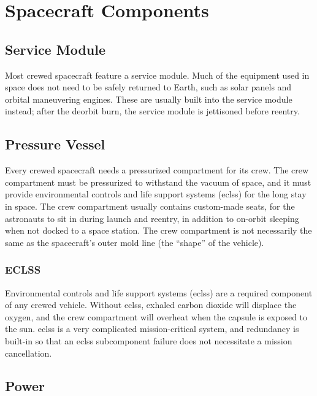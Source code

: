 
\chapter{Spacecraft Components}

\section{Service Module}

Most crewed spacecraft feature a service module. Much of the equipment
used in space does not need to be safely returned to Earth, such as
solar panels and orbital maneuvering engines. These are usually built
into the service module instead; after the deorbit burn, the service
module is jettisoned before reentry.


\section{Pressure Vessel}

Every crewed spacecraft needs a pressurized compartment for its
crew. The crew compartment must be pressurized to withstand the vacuum
of space, and it must provide environmental controls and life support
systems (\acrshort{eclss}) for the long stay in space. The crew compartment
usually contains custom-made seats, for the astronauts to sit in
during launch and reentry, in addition to on-orbit sleeping when not
docked to a space station. The crew compartment is not necessarily the
same as the spacecraft's outer mold line (the ``shape'' of the vehicle).


\subsection{ECLSS}

Environmental controls and life support systems (\acrshort{eclss}) are
a required component of any crewed vehicle. Without \acrshort{eclss}, exhaled
carbon dioxide will displace the oxygen, and the crew compartment will
overheat when the capsule is exposed to the sun. \acrshort{eclss} is a very
complicated mission-critical system, and redundancy is built-in so
that an \acrshort{eclss} subcomponent failure does not necessitate a mission
cancellation.

\section{Power}

